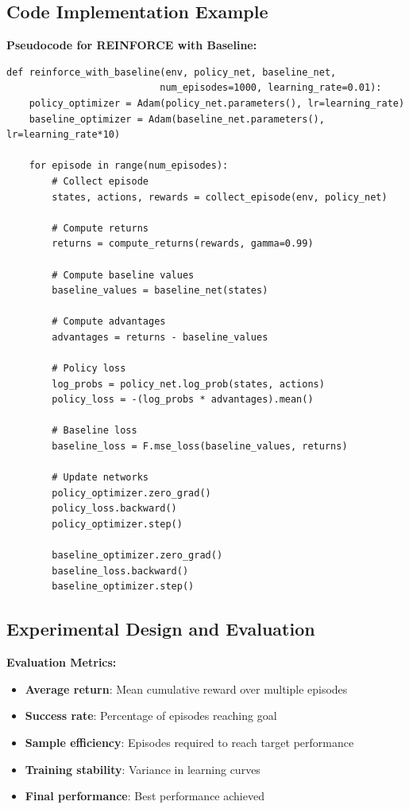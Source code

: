 \documentclass[12pt]{article}
\begin{document}
{{{\subsection{Code Implementation Example}

\textbf{Pseudocode for REINFORCE with Baseline:}
\begin{verbatim}
def reinforce_with_baseline(env, policy_net, baseline_net, 
                           num_episodes=1000, learning_rate=0.01):
    policy_optimizer = Adam(policy_net.parameters(), lr=learning_rate)
    baseline_optimizer = Adam(baseline_net.parameters(), lr=learning_rate*10)
    
    for episode in range(num_episodes):
        # Collect episode
        states, actions, rewards = collect_episode(env, policy_net)
        
        # Compute returns
        returns = compute_returns(rewards, gamma=0.99)
        
        # Compute baseline values
        baseline_values = baseline_net(states)
        
        # Compute advantages
        advantages = returns - baseline_values
        
        # Policy loss
        log_probs = policy_net.log_prob(states, actions)
        policy_loss = -(log_probs * advantages).mean()
        
        # Baseline loss
        baseline_loss = F.mse_loss(baseline_values, returns)
        
        # Update networks
        policy_optimizer.zero_grad()
        policy_loss.backward()
        policy_optimizer.step()
        
        baseline_optimizer.zero_grad()
        baseline_loss.backward()
        baseline_optimizer.step()
\end{verbatim}

\subsection{Experimental Design and Evaluation}

\textbf{Evaluation Metrics:}
\begin{itemize}
    \item \textbf{Average return}: Mean cumulative reward over multiple episodes
    \item \textbf{Success rate}: Percentage of episodes reaching goal
    \item \textbf{Sample efficiency}: Episodes required to reach target performance
    \item \textbf{Training stability}: Variance in learning curves
    \item \textbf{Final performance}: Best performance achieved
\end{itemize}

}}}
\end{document}
